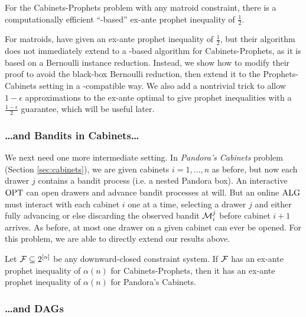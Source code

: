 \begin{theorem*}
  For the Cabinets-Prophets problem with any matroid constraint, there is a computationally efficient ``\SAUP{}-based'' ex-ante prophet inequality of $\frac{1}{2}$.
\end{theorem*}
For matroids, \citet{lee2018optimal} have given an ex-ante prophet inequality of $\frac{1}{2}$, but their algorithm does not immediately extend to a \SAUP{}-based algorithm for Cabinets-Prophets, as it is based on a Bernoulli instance reduction.
Instead, we show how to modify their proof to avoid the black-box Bernoulli reduction, then extend it to the Prophets-Cabinets setting in a \SAUP{}-compatible way.
We also add a nontrivial trick to allow $1-\epsilon$ approximations to the ex-ante optimal to give prophet inequalities with a $\frac{1-\epsilon}{2}$ guarantee, which will be useful later.


\subsubsection{\dots{}and Bandits in Cabinets\dots{}}

We next need one more intermediate setting.
In \emph{Pandora's Cabinets} problem (Section \ref{sec:cabinets}), we are given cabinets $i=1,\dots,n$ as before, but now each drawer $j$ contains a bandit process (i.e. a nested Pandora box).
An interactive $\mathrm{OPT}$ can open drawers and advance bandit processes at will.
But an online $\mathrm{ALG}$ must interact with each cabinet $i$ one at a time, selecting a drawer $j$ and either fully advancing or else discarding the observed bandit $\mathcal{M}_i^j$ before cabinet $i+1$ arrives.
As before, at most one drawer on a given cabinet can ever be opened.
For this problem, we are able to directly extend our results above.

\begin{theorem*}
  Let $\mathcal{F} \subseteq 2^{[n]}$ be any downward-closed constraint system.
  If $\mathcal{F}$ has an ex-ante prophet inequality of $\alpha(n)$ for Cabinets-Prophets, then it has an ex-ante prophet inequality of $\alpha(n)$ for Pandora's Cabinets.
\end{theorem*}



\subsubsection{\dots{}and DAGs}

